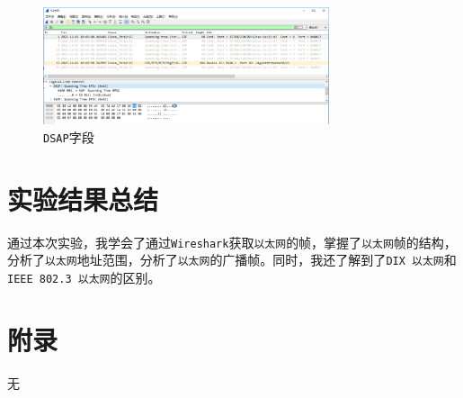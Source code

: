 \documentclass{article}
\begin{document}
\begin{enumerate}[noitemsep]
        \begin{figure}[H]
          \centering
          \includegraphics[width=0.75\textwidth]{images/19.png}
          \caption{\texttt{DSAP}字段}
        \end{figure}

\end{enumerate}


\section{实验结果总结}

通过本次实验，我学会了通过\texttt{Wireshark}获取\texttt{以太网}的帧，掌握了\texttt{以太网}帧的结构，分析了\texttt{以太网}地址范围，分析了\texttt{以太网}的广播帧。同时，我还了解到了\texttt{DIX 以太网}和\texttt{IEEE 802.3 以太网}的区别。

\section{附录}

无
\end{document}
